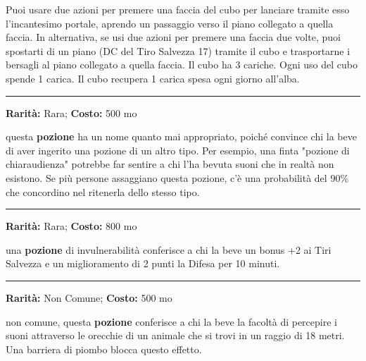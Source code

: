 \begin{multicols}{2}
Puoi usare due azioni per premere una faccia del cubo per lanciare tramite esso l'incantesimo portale, aprendo un passaggio verso il piano collegato a quella faccia. In alternativa, se usi due azioni per premere una faccia due volte, puoi spostarti di un piano (DC del Tiro Salvezza 17) tramite il cubo e trasportarne i bersagli al piano collegato a quella faccia. Il cubo ha 3 cariche. Ogni uso del cubo spende 1 carica. Il cubo recupera 1 carica spesa ogni giorno all'alba.

\smallskip\noindent\rule{\linewidth}{2pt}  \hypertarget{Pozionedell'Inganno}{}\smallskip{}\noindent\label{Pozionedell'Inganno}

\textbf{Rarità:} Rara; \textbf{Costo:} 500 mo

questa \textbf{pozione} ha un nome quanto mai appropriato, poiché convince chi la beve di aver ingerito una pozione di un altro tipo. Per esempio, una finta "pozione di chiaraudienza" potrebbe far sentire a chi l'ha bevuta suoni che in realtà non esistono. Se più persone assaggiano questa pozione, c'è una probabilità del 90\% che concordino nel ritenerla dello stesso tipo.

\smallskip\noindent\rule{\linewidth}{2pt}  \hypertarget{Pozionedell'invulnerabilità}{}\smallskip{}\noindent\label{Pozionedell'invulnerabilità}

\textbf{Rarità:} Rara; \textbf{Costo:} 800 mo

una \textbf{pozione} di invulnerabilità conferisce a chi la beve un bonus +2 ai Tiri Salvezza e un miglioramento di 2 punti la Difesa per 10 minuti.

\smallskip\noindent\rule{\linewidth}{2pt}  \hypertarget{PozionedellaChiaraudienzaanimale}{}\smallskip{}\noindent\label{PozionedellaChiaraudienzaanimale}

\textbf{Rarità:} Non Comune; \textbf{Costo:} 500 mo

non comune, questa \textbf{pozione} conferisce a chi la beve la facoltà di percepire i suoni attraverso le orecchie di un animale che si trovi in un raggio di 18 metri. Una barriera di piombo blocca questo effetto.


\end{multicols}
